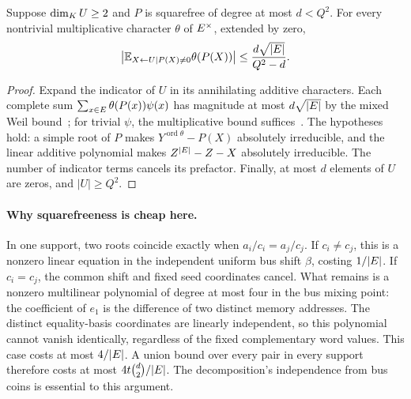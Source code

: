 \begin{lemma}\label{lem:zk-memory-root-mixing}
Suppose $\dim_{K}U\ge2$ and $P$ is squarefree of degree at most $d<Q^2$. For every nontrivial multiplicative character $\theta$ of $E^\times$, extended by zero,
\[
 \left|\mathbb E_{X\gets U\mid P(X)\ne0}\theta(P(X))\right|
 \le\frac{d\sqrt{|E|}}{Q^2-d}.
\]
\end{lemma}
\begin{proof}
Expand the indicator of $U$ in its annihilating additive characters. Each complete sum $\sum_{x\in E}\theta(P(x))\psi(x)$ has magnitude at most $d\sqrt{|E|}$ by the mixed Weil bound~\cite{winger}; for trivial $\psi$, the multiplicative bound suffices~\cite{kowalski}. The hypotheses hold: a simple root of $P$ makes $Y^{\operatorname{ord}\theta}-P(X)$ absolutely irreducible, and the linear additive polynomial makes $Z^{|E|}-Z-X$ absolutely irreducible. The number of indicator terms cancels its prefactor. Finally, at most $d$ elements of $U$ are zeros, and $|U|\ge Q^2$.
\end{proof}

\paragraph{Why squarefreeness is cheap here.} In one support, two roots coincide exactly when $a_i/c_i=a_j/c_j$. If $c_i\ne c_j$, this is a nonzero linear equation in the independent uniform bus shift $\beta$, costing $1/|E|$. If $c_i=c_j$, the common shift and fixed seed coordinates cancel. What remains is a nonzero multilinear polynomial of degree at most four in the bus mixing point: the coefficient of $e_1$ is the difference of two distinct memory addresses. The distinct equality-basis coordinates are linearly independent, so this polynomial cannot vanish identically, regardless of the fixed complementary word values. This case costs at most $4/|E|$. A union bound over every pair in every support therefore costs at most $4t\binom d2/|E|$. The decomposition's independence from bus coins is essential to this argument.

